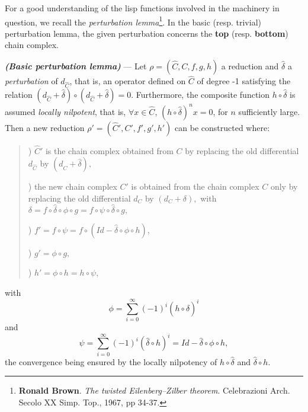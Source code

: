 For a good understanding of the lisp functions involved in the machinery in question,
we recall the {\em perturbation lemma}\footnote{{\bf Ronald Brown}. {\em The twisted Eilenberg--Zilber theorem}.
Celebrazioni Arch. Secolo XX Simp. Top., 1967, pp 34-37.}. In the basic (resp. trivial) perturbation lemma,
the given perturbation concerns the {\bf top} (resp. {\bf bottom}) chain complex. 

\begin{thr}
{\em \bf (Basic perturbation lemma)} --- Let
$\rho=(\hat{C},C,f,g,h)$ a reduction and $\hat{\delta}$ a {\em perturbation} of
$d_{\hat{C}}$, that is, an operator defined on $\hat{C}$ of degree -1 satisfying
the relation $(d_{\hat{C}}+\hat{\delta})\circ(d_{\hat{C}}+\hat{\delta})=0$.
Furthermore, the composite function $h\circ\hat{\delta}$ is assumed {\em
locally nilpotent}, that is, $\forall x \in \hat{C}$,
$(h\circ\hat{\delta})^nx=0$, for $n$ sufficiently large. Then a new reduction
$\rho'=(\hat{C}',C',f',g',h')$ can be constructed where:
\begin{quotation}

) $\hat{C}'$ is the chain complex obtained from $C$ by replacing the old
differential $d_{\hat{C}}$ by $(d_{\hat{C}}+\hat{\delta}),$

) the new chain complex $C'$ is obtained from the chain complex $C$ only by
replacing  the old differential $d_C$ by $(d_C + \delta),$ 
with $\delta = f \circ {\hat \delta} \circ \phi \circ g =
               f \circ \psi \circ {\hat \delta} \circ g,$

) $f'= f \circ \psi = f \circ (Id - {\hat \delta} \circ \phi \circ h),$

) $g'= \phi \circ g,$

) $h'= \phi \circ h = h \circ \psi$,
\end{quotation}
with 
$$\phi=\sum_{i=0}^{\infty}{(-1)^i(h \circ  \hat{\delta})^i}$$
and
$$\psi=\sum_{i=0}^{\infty}{(-1)^i(\hat{\delta}\circ h)^i} = Id - {\hat \delta} \circ \phi \circ h,$$
the convergence being ensured by the locally nilpotency of
$h \circ \hat{\delta}$ and $\hat{\delta} \circ h$.
\end{thr}
\vskip 0.45cm
